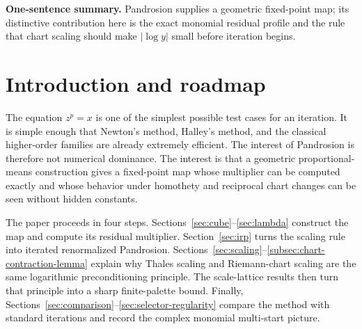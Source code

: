 \documentclass[10pt,a4paper]{article}
\theoremstyle{plain}
\theoremstyle{definition}
\theoremstyle{remark}
\newenvironment{takeaway}{%
  \begin{center}\begin{minipage}{0.92\linewidth}\small\itshape\color{blue!45!black}%
}{%
  \end{minipage}\end{center}%
}
\begin{document}
\begin{abstract}
Finally, iterated renormalized Pandrosion (IRP) turns the scaling rule into
a dynamic acceleration principle.  Each layer renormalizes the current
multiplicative residual, applies one raw Pandrosion readout in the normalized
cell, and returns to the root coordinate.  Locally, one such layer is
quadratic in the logarithmic root error, and repeated layers amplify the
order dyadically.  The complex monomial extension is kept at the level needed for an
expository account: cyclotomic anchors, local seeding disks, and a finite
selector.  The result is a deliberately narrow but coherent account of the
Pandrosion monomial scheme: fixed point, contraction, scaling, reciprocal
charts, iterated renormalization, and complex roots.
\end{abstract}

\begin{takeaway}
\textbf{One-sentence summary.}
Pandrosion supplies a geometric fixed-point map; its distinctive contribution here is the exact monomial residual profile and the rule that chart scaling should make $|\log y|$ small before iteration begins.
\end{takeaway}

\clearpage
\renewcommand{\contentsname}{Sommaire}
\tableofcontents
\clearpage


\section{Introduction and roadmap}
\label{sec:intro}

The equation $z^p=x$ is one of the simplest possible test cases for an
iteration.  It is simple enough that Newton's method, Halley's method, and the
classical higher-order families are already extremely efficient.  The interest
of Pandrosion is therefore not numerical dominance.  The interest is that a
geometric proportional-means construction gives a fixed-point map whose
multiplier can be computed exactly and whose behavior under homothety and
reciprocal chart changes can be seen without hidden constants.

The paper proceeds in four steps.  Sections~\ref{sec:cube}--\ref{sec:lambda}
construct the map and compute its residual multiplier.  Section~\ref{sec:irp}
turns the scaling rule into iterated renormalized Pandrosion.
Sections~\ref{sec:scaling}--\ref{subsec:chart-contraction-lemma}
explain why Thales scaling and Riemann-chart scaling are the same logarithmic
preconditioning principle.  The scale-lattice results then turn that principle
into a sharp finite-palette bound.  Finally, Sections~\ref{sec:comparison}--\ref{sec:selector-regularity}
compare the method with standard iterations and record the complex monomial
multi-start picture.
\end{document}
